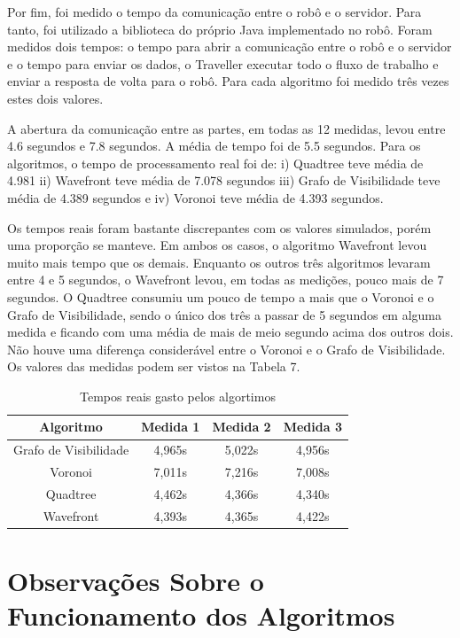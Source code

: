 Por fim, foi medido o tempo da comunicação entre o robô e o servidor. Para tanto, foi utilizado a biblioteca do próprio Java implementado no robô. Foram medidos dois tempos: o tempo para abrir a comunicação entre o robô e o servidor e o tempo para enviar os dados, o Traveller executar todo o fluxo de trabalho e enviar a resposta de volta para o robô. Para cada algoritmo foi medido três vezes estes dois valores.

A abertura da comunicação entre as partes, em todas as 12 medidas, levou entre 4.6 segundos e 7.8 segundos. A média de tempo foi de 5.5 segundos. Para os algoritmos, o tempo de processamento real foi de: i) Quadtree teve média de 4.981 ii) Wavefront teve média de 7.078 segundos iii) Grafo de Visibilidade teve média de 4.389 segundos e iv) Voronoi teve média de 4.393 segundos.

Os tempos reais foram bastante discrepantes com os valores simulados, porém uma proporção se manteve. Em ambos os casos, o algoritmo Wavefront levou muito mais tempo que os demais. Enquanto os outros três algoritmos levaram entre 4 e 5 segundos, o Wavefront levou, em todas as medições, pouco mais de 7 segundos. O Quadtree consumiu um pouco de tempo a mais que o Voronoi e o Grafo de Visibilidade, sendo o único dos três a passar de 5 segundos em alguma medida e ficando com uma média de mais de meio segundo acima dos outros dois. Não houve uma diferença considerável entre o Voronoi e o Grafo de Visibilidade. Os valores das medidas podem ser vistos na Tabela 7.

\begin{table}[h]
	\centering
	\label{tab07}
	\caption{Tempos reais gasto pelos algortimos}
	\begin{tabular}{c|c|c|c}
		\toprule
		\textbf{Algoritmo} & \textbf{Medida 1} & \textbf{Medida 2} & \textbf{Medida 3} \\
		\midrule
Grafo de Visibilidade & 4,965s  & 5,022s & 4,956s \\
Voronoi 				  & 7,011s  & 7,216s & 7,008s \\
Quadtree				  & 4,462s  & 4,366s & 4,340s \\
Wavefront             & 4,393s  & 4,365s & 4,422s  \\
		\bottomrule
	\end{tabular}
\end{table}

\section{Observações Sobre o Funcionamento dos Algoritmos}

